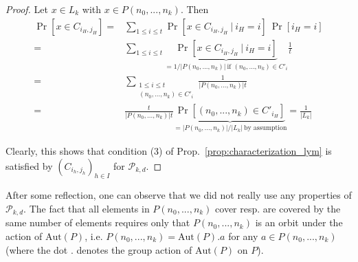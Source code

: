 \documentclass{scrartcl}
\theoremstyle{definition}
\begin{document}
\begin{proof}
    Let $x \in L_k$ with $x \in P(n_0, ..., n_k)$.
    Then
    \begin{align*}
        \Pr[x \in C_{i_H, j_H}] =& \sum_{1 \leq i \leq t} \Pr[x \in C_{i_H, j_H} \ | \ i_H = i] \ \Pr[i_H = i] \\
        =& \sum_{1 \leq i \leq t} \underbrace{\Pr[x \in C_{i_H, j_H} \ | \ i_H = i]}_{ = 1 / |P(n_0, ..., n_k)| \ \text{if $(n_0, ..., n_k) \in C'_i$}} \frac 1 t \\
        =& \sum_{\substack{1 \leq i \leq t\\(n_0, ..., n_k) \in C'_i}} \frac 1 {|P(n_0, ..., n_k)| t} \\
        =& \frac t {|P(n_0, ..., n_k)| t} \underbrace{\Pr[(n_0, ..., n_k) \in C'_{i_H}]}_{= |P(n_0, ..., n_k)| / |L_k| \ \text{by assumption}} = \frac 1 {|L_k|}
    \end{align*}

    Clearly, this shows that condition (3) of Prop.~\ref{prop:characterization_lym} is satisfied by $(C_{i_h, j_h})_{h \in I}$ for $\mathcal{P}_{k, d}$.
\end{proof}
After some reflection, one can observe that we did not really use any properties of $\mathcal{P}_{k, d}$.
The fact that all elements in $P(n_0, ..., n_k)$ cover resp. are covered by the same number of elements requires only that $P(n_0, ..., n_k)$ is an orbit under the action of $\mathrm{Aut}(P)$, i.e. $P(n_0, ..., n_k) = \mathrm{Aut}(P).a$ for any $a \in P(n_0, ..., n_k)$
(where the dot $.$ denotes the group action of $\mathrm{Aut}(P)$ on $P$).
\end{document}
